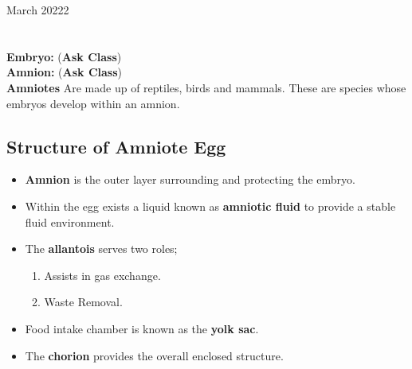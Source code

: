 \documentclass[12pt,oneside]{book} %
\begin{document}
	\renewcommand*{\term}{Term 2} %
	\renewcommand*{\coursecode}{MCR3U} %
	\renewcommand*{\coursename}{Course Name} %
	\renewcommand*{\thelecnum}{4} %
	\renewcommand*{\profname}{Prof Name} %
	\renewcommand*{\colink}{http://www.student.math.uwaterloo.ca/~c2kent} %
	\clearpage
	\pagestyle{classlecture}
\begin{lec}{March 20222}
	\chapter{\chapname\chaplec}

  \textbf{Embryo:} (\textbf{Ask Class})\\
  
  \textbf{Amnion:} (\textbf{Ask Class})\\

  \textbf{Amniotes} Are made up of reptiles, birds and mammals. These are species whose embryos develop within an amnion.


  \section*{Structure of Amniote Egg}
  \begin{itemize}
    \item \textbf{Amnion} is the outer layer surrounding and protecting the embryo.
    \item Within the egg exists a liquid known as \textbf{amniotic fluid} to provide a stable fluid environment.
    \item The \textbf{allantois} serves two roles;
      \begin{enumerate}
        \item Assists in gas exchange.
        \item Waste Removal.
      \end{enumerate}
    \item Food intake chamber is known as the \textbf{yolk sac}.
    \item The \textbf{chorion} provides the overall enclosed structure.
  \end{itemize}


\end{lec}
\end{document}

